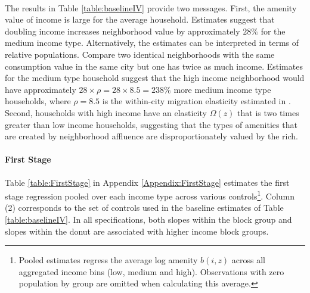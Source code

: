 \documentclass[12pt]{article}
\begin{document}
\paragraph*{}
The results in Table \ref{table:baselineIV} provide two messages. First, the amenity value of income is large for the average household. Estimates suggest that doubling income increases neighborhood value by approximately $28 \%$ for the medium income type. Alternatively, the estimates can be interpreted in terms of relative populations. Compare two identical neighborhoods with the same consumption value in the same city but one has twice as much income. Estimates for the medium type household suggest that the high income neighborhood would have approximately $28 \times \rho = 28 \times 8.5 = 238 \%$ more medium income type households, where $\rho=8.5$ is the within-city migration elasticity estimated in \cite{BSH}. Second, households with high income have an elasticity $\Omega(z)$ that is two times greater than low income households, suggesting that the types of amenities that are created by neighborhood affluence are disproportionately valued by the rich.

\paragraph*{First Stage} Table \ref{table:FirstStage} in Appendix \ref{Appendix:FirstStage} estimates the first stage regression pooled over each income type across various controls\footnote{Pooled estimates regress the average log amenity $b(i, z)$ across all aggregated income bins (low, medium and high). Observations with zero population by group are omitted when calculating this average.}. Column (2) corresponds to the set of controls used in the baseline estimates of Table \ref{table:baselineIV}. In all specifications, both slopes within the block group and slopes within the donut are associated with higher income block groups.
\end{document}
